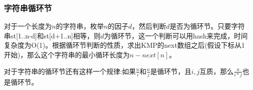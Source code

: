 \subsubsection{字符串循环节}
对于一个长度为$n$的字符串，枚举$n$的因子$d$，然后判断$d$是否为循环节。只要字符串st[1..n-d]和st[d+1..n]相等，则$d$为循环节，这一个判断可以用hash来完成，时间复杂度为O(1)。根据循环节判断的性质，求出KMP的next数组之后(假设下标从1开始)，那么这个字符串的最小循环长度为$n-next[n]$。\par
对于字符串的循环节还有这样一个规律:如果$\frac{n}{i}$和$\frac{n}{j}$是循环节，且$i,j$互质，那么$\frac{n}{i*j}$也是循环节。\par
